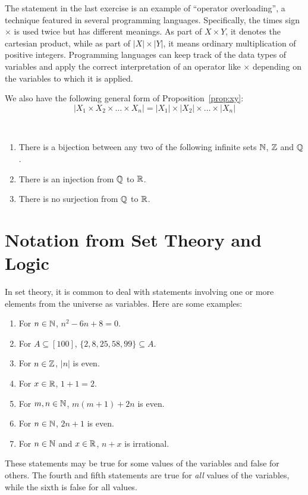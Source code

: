 \begin{remark}
The statement in the last exercise is an example of ``operator
overloading'', a technique featured in several programming
languages.  Specifically, the times sign $\times$ is used
twice but has different meanings.  As part of $X\times Y$, it
denotes the cartesian product, while as part of $|X|\times |Y|$,
it means ordinary multiplication of positive integers.  Programming
languages can keep track of the data types of variables and
apply the correct interpretation of an operator like $\times$
depending on the variables to which it is applied.
\end{remark}

We also have the following general form of Proposition~\ref{prop:xy}:
\[
|X_1\times X_2\times\dots\times X_n|=
|X_1|\times |X_2|\times\dots\times |X_n|
\]

\begin{theorem}\hfill\mbox{}\\
\begin{enumerate}
\item There is a bijection between any two of the following
infinite sets $\mathbb{N}$, $\mathbb{Z}$ and $\mathbb{Q}$. 
\item There is an injection from $\mathbb{Q}$ to $\mathbb{R}$.
\item There is no surjection from $\mathbb{Q}$ to $\mathbb{R}$.
\end{enumerate}
\end{theorem}

\section{Notation from Set Theory and Logic}\label{s:background:notation}

In set theory, it is common to deal with statements 
involving one or more elements from the universe as
variables.  Here are some examples:
\begin{enumerate}
\item For $n\in\mathbb{N}$, $n^2-6n+8=0$.
\item For $A\subseteq[100]$, $\{2,8,25,58,99\}\subseteq A$.
\item For $n\in \mathbb{Z}$, $|n|$ is even.
\item For $x\in \mathbb{R}$, $1+1=2$.
\item For $m,n\in \mathbb{N}$, $m(m+1)+2n$ is even.
\item For $n\in \mathbb{N}$, $2n+1$ is even.
\item For $n\in \mathbb{N}$ and $x\in\mathbb{R}$, $n+x$ is
irrational.
\end{enumerate}
These statements may be true for some values of the variables
and false for others.  The fourth and fifth statements
are true for \textit{all} values of the variables, while
the sixth is false for all values.


